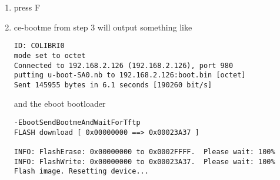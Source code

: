\begin{enumerate}
\item press F

\item ce-bootme from step 3 will output something like
\begin{verbatim}
ID: COLIBRI0
mode set to octet
Connected to 192.168.2.126 (192.168.2.126), port 980
putting u-boot-SA0.nb to 192.168.2.126:boot.bin [octet]
Sent 145955 bytes in 6.1 seconds [190260 bit/s]
\end{verbatim}

     and the eboot bootloader

\begin{verbatim}
-EbootSendBootmeAndWaitForTftp
FLASH download [ 0x00000000 ==> 0x00023A37 ]

INFO: FlashErase: 0x00000000 to 0x0002FFFF.  Please wait: 100%
INFO: FlashWrite: 0x00000000 to 0x00023A37.  Please wait: 100%
Flash image. Resetting device...
\end{verbatim}

\end{enumerate}



